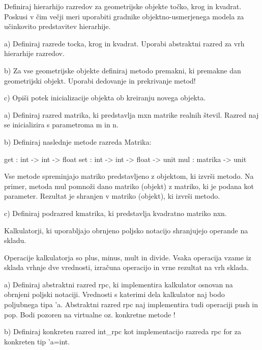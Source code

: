 \begin{ex}
Definiraj hierarhijo razredov za geometrijske objekte to\v cko, krog in kvadrat. Poskusi v \v cim ve\v cji meri uporabiti gradnike objektno-usmerjenega modela za u\v cinkovito predstavitev hierarhije. 

a) Definiraj razrede tocka, krog in kvadrat. Uporabi abstraktni razred za vrh hierarhije razredov.

b) Za vse geometrijske objekte definiraj metodo premakni, ki premakne dan geometrijski objekt. Uporabi dedovanje in prekrivanje metod!

c) Opi\v si potek inicializacije objekta ob kreiranju novega objekta.

\end{ex} 
\begin{ex}
  a) Definiraj razred matrika, ki predstavlja mxn matrike realnih \v
  stevil. Razred naj se inicializira s parametroma m in n.

  b) Definiraj naslednje metode razreda Matrika:

  get : int -> int -> float
  set : int -> int -> float -> unit
  mul : matrika -> unit

  Vse metode spreminjajo matriko predstavljeno z objektom, ki izvr\v
  si metodo.  Na primer, metoda mul pomno\v zi dano matriko (objekt) z
  matriko, ki je podana kot parameter. Rezultat je shranjen v matriko
  (objekt), ki izvr\v si metodo.

  c) Definiraj podrazred kmatrika, ki predstavlja kvadratno matriko
  nxn.


\end{ex} 
\begin{ex}
  Kalkulatorji, ki uporabljajo obrnjeno poljsko notacijo shranjujejo
  operande na skladu.

  Operacije kalkulatorja so plus, minus, mult in divide. Vsaka
  operacija vzame iz sklada vrhnje dve vrednosti, izra\v cuna
  operacijo in vrne rezultat na vrh sklada.

  a) Definiraj abstraktni razred rpc, ki implementira kalkulator
  osnovan na obrnjeni poljski notaciji. Vrednosti s katerimi dela
  kalkulator naj bodo poljubnega tipa 'a. Abstraktni razred rpc naj
  implementira tudi operaciji push in pop. Bodi pozoren na
  virtualne oz. konkretne metode !

  b) Definiraj konkreten razred int\_rpc kot implementacijo razreda
  rpc for za konkreten tip 'a=int.


\end{ex} 
